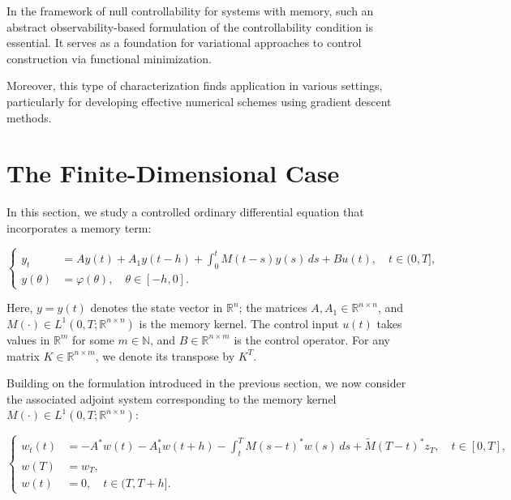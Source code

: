 \documentclass[12pt]{article}
\theoremstyle{plain}
\theoremstyle{definition}
\begin{document}
In the framework of null controllability for systems with memory, such an abstract observability-based formulation of the controllability condition is essential. It serves as a foundation for variational approaches to control construction via functional minimization.

Moreover, this type of characterization finds application in various settings, particularly for developing effective numerical schemes using gradient descent methods.




\section{The Finite-Dimensional Case}
In this section, we study a controlled ordinary differential equation that incorporates a memory term:

\begin{equation}\label{eq:Finite_eq_1}
\left\{
\begin{aligned}
y_t &= Ay(t)+A_1 y(t-h) + \int_0^t M(t-s)y(s)\,ds + Bu(t), \quad t \in (0,T], \\
y(\theta) &= \varphi (\theta), \quad \theta \in [-h, 0].
\end{aligned}
\right.
\end{equation}

Here, \( y = y(t) \) denotes the state vector in \( \mathbb{R}^n \); the matrices \( A, A_1 \in \mathbb{R}^{n \times n} \), and \( M(\cdot) \in L^1(0,T;\mathbb{R}^{n \times n}) \) is the memory kernel. The control input \( u(t) \) takes values in \( \mathbb{R}^m \) for some \( m \in \mathbb{N} \), and \( B \in \mathbb{R}^{n \times m} \) is the control operator. For any matrix \( K \in \mathbb{R}^{n \times m} \), we denote its transpose by \( K^T \).

Building on the formulation introduced in the previous section, we now consider the associated adjoint system corresponding to the memory kernel \( M(\cdot) \in L^1(0,T; \mathbb{R}^{n \times n}) \):

\begin{equation}
\label{eq:Finite_eq_2}
\left\{
\begin{aligned}
    w_t(t) &= -A^* w(t) - A_1^* w(t + h) - \int_t^T M(s - t)^* w(s)\,ds +\widetilde{M}(T - t)^* z_T, \quad t \in [0, T], \\
    w(T) &= w_T, \\
    w(t) &= 0, \quad t \in (T, T + h].
\end{aligned}
\right.
\end{equation}
\end{document}
